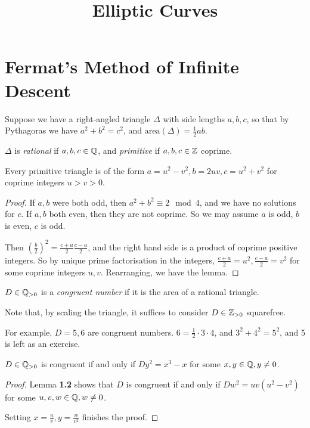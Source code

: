 \documentclass[10pt,a4paper]{article}
\title{Elliptic Curves}
\begin{document}
\maketitle
\tableofcontents
\newpage
\section{Fermat's Method of Infinite Descent}
Suppose we have a right-angled triangle $\Delta$ with side lengths $a, b, c$, so that by Pythagoras we have $a^2 + b^2 = c^2$, and $\text{area}(\Delta) = \frac12 ab$.
\begin{definition}
  $\Delta$ is \emph{rational} if $a, b, c \in \mathbb{Q}$, and \emph{primitive} if $a, b, c \in \mathbb{Z}$ coprime.
\end{definition}
\begin{lemma}
  Every primitive triangle is of the form $a = u^2-v^2, b = 2uv, c = u^2+v^2$ for coprime integers $u > v > 0$.
\end{lemma}
\begin{proof}
  If $a, b$ were both odd, then $a^2 + b^2 \equiv 2 \mod 4$, and we have no solutions for $c$. If $a,b$ both even, then they are not coprime. So we may assume $a$ is odd, $b$ is even, $c$ is odd.

  Then $(\frac{b}{2})^2 = \frac{c+a}{2}\frac{c-a}{2}$, and the right hand side is a product of coprime positive integers. So by unique prime factorisation in the integers, $\frac{c+a}{2} = u^2, \frac{c-a}{2} = v^2$ for some coprime integers $u, v$. Rearranging, we have the lemma.
\end{proof}

\begin{definition}
  $D \in \mathbb{Q}_{>0}$ is a \emph{congruent number} if it is the area of a rational triangle.
\end{definition}
Note that, by scaling the triangle, it suffices to consider $D \in \mathbb{Z}_{>0}$ squarefree.

For example, $D = 5,6$ are congruent numbers. $6 = \frac12\cdot 3\cdot 4$, and $3^2+4^2 = 5^2$, and 5 is left as an exercise.

\begin{lemma}
  $D \in \mathbb{Q}_{>0}$ is congruent if and only if $Dy^2 = x^3-x$ for some $x, y \in \mathbb{Q}, y \neq 0$.
\end{lemma}
\begin{proof}
  Lemma \textbf{1.2} shows that $D$ is congruent if and only if $Dw^2 = uv(u^2-v^2)$ for some $u,v,w\in \mathbb{Q}, w\neq 0$.

  Setting $x = \frac{u}{v}, y = \frac{w}{v^2}$ finishes the proof.
\end{proof}
\end{document}
